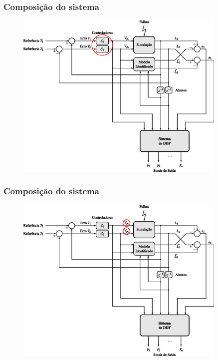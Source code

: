 \documentclass{beamer}
\begin{document}
\begin{frame}
    \frametitle{Composição do sistema}

\begin{figure}[htb]
\centering
    \includegraphics[width=0.9\textwidth]{imgs/sistema/eps/composicao_mod_2}
\end{figure}
\end{frame}

\begin{frame}
    \frametitle{Composição do sistema}

\begin{figure}[htb]
\centering
    \includegraphics[width=0.9\textwidth]{imgs/sistema/eps/composicao_mod_3}
\end{figure}
\end{frame}
\end{document}
